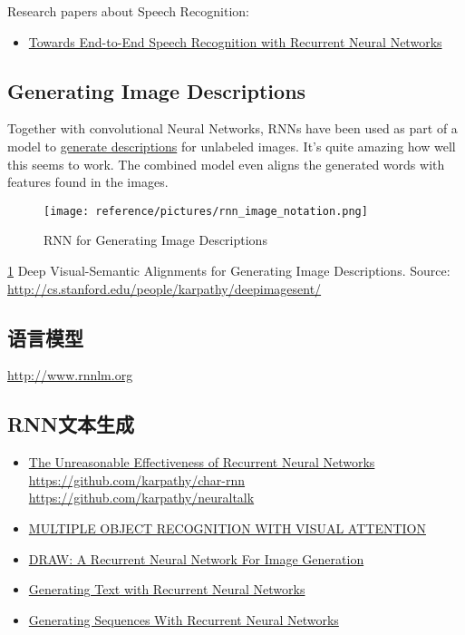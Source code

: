 \documentclass[10pt,a4paper]{ctexbook}
\begin{document}
Research papers about Speech Recognition:
\begin{itemize}
\item \href{http://www.jmlr.org/proceedings/papers/v32/graves14.pdf}{Towards End-to-End Speech Recognition with Recurrent Neural Networks}
\end{itemize}


\subsection{Generating Image Descriptions}
Together with convolutional Neural Networks, RNNs have been used as part of a model to \href{http://cs.stanford.edu/people/karpathy/deepimagesent/}{generate descriptions} for unlabeled images. It's quite amazing how well this seems to work. The combined model even aligns the generated words with features found in the images.

\begin{figure}[ht]
    \centering
    \texttt{[image: reference/pictures/rnn\_image\_notation.png]}
    \caption{RNN for Generating Image Descriptions}
    \label{fig:rnn_image_notation}
\end{figure}
\ref{fig:rnn_image_notation}
Deep Visual-Semantic Alignments for Generating Image Descriptions.
Source: \url{http://cs.stanford.edu/people/karpathy/deepimagesent/}


\subsection{语言模型}
\href{Mikolov et al.}{http://www.rnnlm.org}

\subsection{RNN文本生成}
\begin{itemize}
\item \href{http://karpathy.github.io/2015/05/21/rnn-effectiveness/}{The Unreasonable Effectiveness of Recurrent Neural Networks}
\subitem \url{https://github.com/karpathy/char-rnn}
\subitem \url{https://github.com/karpathy/neuraltalk}
\item \href{https://arxiv.org/abs/1412.7755}{MULTIPLE OBJECT RECOGNITION WITH VISUAL ATTENTION}
\item \href{https://arxiv.org/abs/1502.04623}{DRAW: A Recurrent Neural Network For Image Generation}
\item \href{http://www.cs.utoronto.ca/~ilya/pubs/2011/LANG-RNN.pdf}{Generating Text with Recurrent Neural Networks}
\item \href{https://arxiv.org/abs/1308.0850}{Generating Sequences With Recurrent Neural Networks}
\end{itemize}
\end{document}
